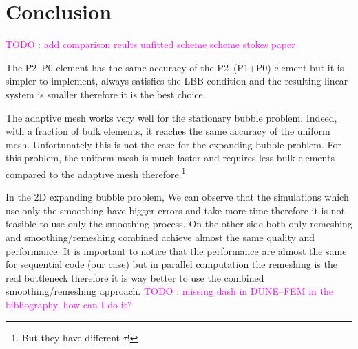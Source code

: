 \documentclass[a4paper,12pt,onecolumn]{article}
\begin{document}
\section{Conclusion}\label{sec:conclusion}
\textcolor{magenta}{TODO : add comparison reults unfitted scheme scheme stokes paper}

The P2--P0 element has the same accuracy of the P2--(P1+P0) element but it is simpler to implement, always satisfies the LBB condition and the resulting linear system is smaller therefore it is the best choice.

The adaptive mesh works very well for the stationary bubble problem. Indeed, with a fraction of bulk elements, it reaches the same accuracy of the uniform mesh. Unfortunately this is not the case for the expanding bubble problem. For this problem, the uniform mesh is much faster and requires less bulk elements compared to the adaptive mesh therefore.\footnote{But they have different $\tau$!}

In the 2D expanding bubble problem, We can observe that the simulations which use only the smoothing have bigger errors and take more time therefore it is not feasible to use only the smoothing process. On the other side both only remeshing and smoothing/remeshing combined achieve almost the same quality and performance. It is important to notice that the performance are almost the same for sequential code (our case) but in parallel computation the remeshing is the real bottleneck therefore it is way better to use the combined smoothing/remeshing approach.
\newpage
\textcolor{magenta}{TODO : missing dash in DUNE--FEM in the bibliography, how can I do it?}
 

\end{document}
